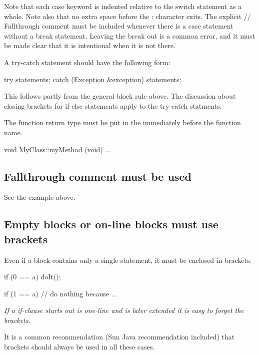 \documentclass[a4paper,11pt,oneside]{scrbook}
\newcommand{\guideline}[1]{{\subsection{#1}}}
\newcommand{\motivation}[1]{{\normalfont \itshape #1}}
\newcommand{\trcode}[1]{{\normalfont \ttfamily #1}}
\begin{document}
Note that each \trcode{case} keyword is indented relative to the switch
statement as a whole. Note also that no extra space before the : character
exits. The explicit \trcode{// Fallthrough} comment must be included whenever
there is a case statement without a \trcode{break} statement. Leaving the
\trcode{break} out is a common error, and it must be made clear that it is
intentional when it is not there.

A \trcode{try-catch} statement should have the following form: 

\begin{code}
  try {
    statements;
  }
  catch (Exception &exception) {
    statements;
  }
\end{code}

This follows partly from the general block rule above. The discussion about
closing brackets for \trcode{if-else} statements apply to the \trcode{try-catch}
statments.

The function return type must be put in the immediately before the function
name.

\begin{code}
  void MyClass::myMethod (void) {
    ...
  } 
\end{code}

\guideline{Fallthrough comment must be used}

See the example above.

\guideline{Empty blocks or on-line blocks must use brackets}

Even if a block contains only a single statement, it must be enclosed in
brackets.

\begin{code}
  if (0 == a) {
    doIt();
  }

  if (1 == a) {
    // do nothing because ...
  }
\end{code}

\motivation{
   If a if-clause starts out is one-line and is later extended it is easy to forget
   the brackets.

  It is a common recommendation (Sun Java recommendation included) that
  brackets should always be used in all these cases.
}

\end{document}
